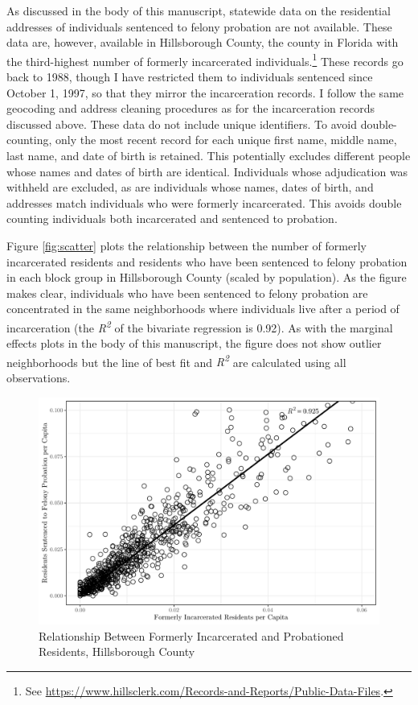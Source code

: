 \documentclass[
  12pt,
]{article}
\begin{document}
As discussed in the body of this manuscript, statewide data on the residential addresses of individuals sentenced to felony probation are not available. These data are, however, available in Hillsborough County, the county in Florida with the third-highest number of formerly incarcerated individuals.\footnote{See \url{https://www.hillsclerk.com/Records-and-Reports/Public-Data-Files}.} These records go back to 1988, though I have restricted them to individuals sentenced since October 1, 1997, so that they mirror the incarceration records. I follow the same geocoding and address cleaning procedures as for the incarceration records discussed above. These data do not include unique identifiers. To avoid double-counting, only the most recent record for each unique first name, middle name, last name, and date of birth is retained. This potentially excludes different people whose names and dates of birth are identical. Individuals whose adjudication was withheld are excluded, as are individuals whose names, dates of birth, and addresses match individuals who were formerly incarcerated. This avoids double counting individuals both incarcerated and sentenced to probation.

Figure \ref{fig:scatter} plots the relationship between the number of formerly incarcerated residents and residents who have been sentenced to felony probation in each block group in Hillsborough County (scaled by population). As the figure makes clear, individuals who have been sentenced to felony probation are concentrated in the same neighborhoods where individuals live after a period of incarceration (the \emph{R\textsuperscript{2}} of the bivariate regression is 0.92). As with the marginal effects plots in the body of this manuscript, the figure does not show outlier neighborhoods but the line of best fit and \emph{R\textsuperscript{2}} are calculated using all observations.

\begin{figure}[H]

{\centering \includegraphics{amendment_4_turnout_files/figure-latex/corrplot-1} 

}

\caption{\label{fig:scatter}Relationship Between Formerly Incarcerated and Probationed Residents, Hillsborough County}\label{fig:corrplot}
\end{figure}
\end{document}
